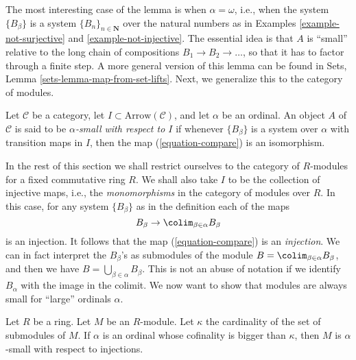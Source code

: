 \noindent
The most interesting case of the lemma is when $\alpha = \omega$, i.e.,
when the system $\{B_\beta\}$ is a system $\{B_n\}_{n \in \mathbf{N}}$
over the natural numbers as in
Examples \ref{example-not-surjective} and
\ref{example-not-injective}.
The essential idea is that $A$ is ``small'' relative to the long chain of
compositions $B_1 \to B_2 \to \dots$, so that it has to factor through a
finite step. A more general version of this lemma can be found in
Sets, Lemma \ref{sets-lemma-map-from-set-lifts}.
Next, we generalize this to the category of modules.

\begin{definition}
\label{definition-small}
Let $\mathcal{C}$ be a category, let $I \subset \text{Arrow}(\mathcal{C})$,
and let $\alpha$ be an ordinal. An object $A$ of $\mathcal{C}$ is said to
be {\it $\alpha$-small with respect to $I$} if whenever $\{B_\beta\}$ is
a system over $\alpha$ with transition maps in $I$, then
the map (\ref{equation-compare}) is an isomorphism.
\end{definition}

\noindent
In the rest of this section we shall restrict ourselves
to the category of $R$-modules for a fixed commutative ring $R$.
We shall also take $I$ to be the collection of injective maps, i.e., the
{\it monomorphisms} in the category of modules over $R$. In this case, for
any system $\{B_\beta\}$ as in the definition each of the maps
$$
B_\beta \to \colim_{\beta \in \alpha} B_\beta
$$
is an injection. It follows that the map (\ref{equation-compare}) is an
{\it injection}. We can in fact interpret the $B_\beta$'s as submodules
of the module $B = \colim_{\beta \in \alpha} B_\beta$, and then we
have $B = \bigcup_{\beta \in \alpha} B_\beta$. This is not an abuse of
notation if we identify $B_\alpha$ with the image in the colimit.
We now want to show that modules are always small for ``large'' ordinals
$\alpha$.

\begin{proposition}
\label{proposition-modules-are-small}
Let $R$ be a ring. Let $M$ be an $R$-module.
Let $\kappa$ the cardinality of the set of submodules of $M$.
If $\alpha$ is an ordinal whose cofinality is bigger than $\kappa$,
then $M$ is $\alpha$-small with respect to injections.
\end{proposition}

